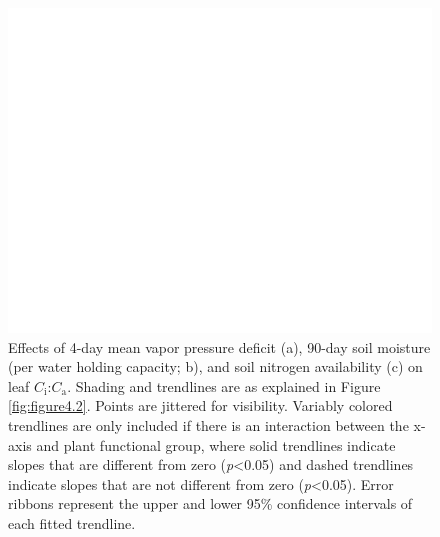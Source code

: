 \newpage
\begin{figure}
    \centering
    \includegraphics[scale = 0.07]{ch4_TXeco/figs/TXeco_fig3_chi.png}
    \caption[Effects of 4-day mean vapor pressure deficit, 2-day soil moisture (per water holding capacity), and soil nitrogen availability on leaf $C_\mathrm{i}$:$C_\mathrm{a}$]{Effects of 4-day mean vapor pressure deficit (a), 90-day soil moisture (per water holding capacity; b), and soil nitrogen availability (c) on leaf $C_\mathrm{i}$:$C_\mathrm{a}$. Shading and trendlines are as explained in Figure \ref{fig:figure4.2}. Points are jittered for visibility. Variably colored trendlines are only included if there is an interaction between the x-axis and plant functional group, where solid trendlines indicate slopes that are different from zero (\textit{p}<0.05) and dashed trendlines indicate slopes that are not different from zero (\textit{p}<0.05). Error ribbons represent the upper and lower 95\% confidence intervals of each fitted trendline.}
    \label{fig:figure4.3}
\end{figure}
\clearpage

